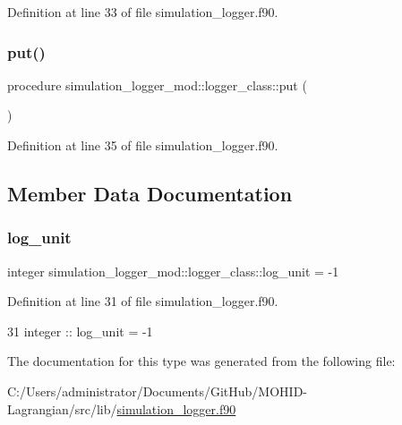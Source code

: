 Definition at line 33 of file simulation\+\_\+logger.\+f90.

\mbox{\label{structsimulation__logger__mod_1_1logger__class_ae99085dc817bbb52855ab4bbd71d1a57}} 
\subsubsection{\texorpdfstring{put()}{put()}}
{\footnotesize\ttfamily procedure simulation\+\_\+logger\+\_\+mod\+::logger\+\_\+class\+::put (\begin{DoxyParamCaption}{ }\end{DoxyParamCaption})\hspace{0.3cm}{\ttfamily [private]}}



Definition at line 35 of file simulation\+\_\+logger.\+f90.



\subsection{Member Data Documentation}
\mbox{\label{structsimulation__logger__mod_1_1logger__class_a6b7412c0a809c5c2e63edd967d1d2f11}} 
\subsubsection{\texorpdfstring{log\+\_\+unit}{log\_unit}}
{\footnotesize\ttfamily integer simulation\+\_\+logger\+\_\+mod\+::logger\+\_\+class\+::log\+\_\+unit = -\/1\hspace{0.3cm}{\ttfamily [private]}}



Definition at line 31 of file simulation\+\_\+logger.\+f90.


\begin{DoxyCode}
31         \textcolor{keywordtype}{integer} :: log\_unit = -1
\end{DoxyCode}


The documentation for this type was generated from the following file\+:\begin{DoxyCompactItemize}
\item 
C\+:/\+Users/administrator/\+Documents/\+Git\+Hub/\+M\+O\+H\+I\+D-\/\+Lagrangian/src/lib/\mbox{\hyperlink{simulation__logger_8f90}{simulation\+\_\+logger.\+f90}}\end{DoxyCompactItemize}
